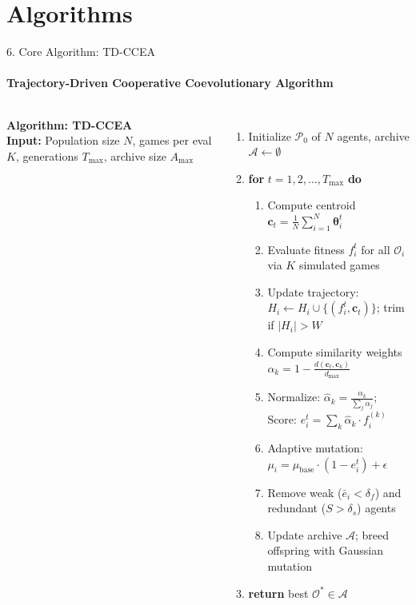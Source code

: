 \documentclass[aspectratio=169, 11pt]{beamer}
\begin{document}
\section{Algorithms}
\begin{frame}{6. Core Algorithm: TD-CCEA}
    \framesubtitle{Trajectory-Driven Cooperative Coevolutionary Algorithm}

    \begin{columns}[T]
        {\small
        \textbf{\textcolor{amritaMaroon}{Algorithm: TD-CCEA}} \\[0.2cm]
        \textbf{Input:} Population size $N$, games per eval $K$, generations $T_{\max}$, archive size $A_{\max}$ \\[0.1cm]
        \begin{enumerate}\footnotesize
            \item Initialize $\mathcal{P}_0$ of $N$ agents, archive $\mathcal{A} \leftarrow \emptyset$
            \item \textbf{for} $t = 1, 2, \ldots, T_{\max}$ \textbf{do}
            \begin{enumerate}\scriptsize
                \item[(a)] Compute centroid $\mathbf{c}_t = \frac{1}{N}\sum_{i=1}^{N}\boldsymbol{\theta}_i^t$
                \item[(b)] Evaluate fitness $f_i^t$ for all $\mathcal{O}_i$ via $K$ simulated games
                \item[(c)] Update trajectory: $H_i \leftarrow H_i \cup \{(f_i^t, \mathbf{c}_t)\}$; trim if $|H_i| > W$
                \item[(d)] Compute similarity weights $\alpha_k = 1 - \frac{d(\mathbf{c}_t, \mathbf{c}_k)}{d_{\max}}$
                \item[(e)] Normalize: $\hat{\alpha}_k = \frac{\alpha_k}{\sum_j \alpha_j}$; \quad Score: $e_i^t = \sum_k \hat{\alpha}_k \cdot f_i^{(k)}$
                \item[(f)] Adaptive mutation: $\mu_i = \mu_{\text{base}} \cdot (1 - e_i^t) + \epsilon$
                \item[(g)] Remove weak ($\bar{e}_i < \delta_f$) and redundant ($S > \delta_s$) agents
                \item[(h)] Update archive $\mathcal{A}$; breed offspring with Gaussian mutation
            \end{enumerate}
            \item \textbf{return} best $\mathcal{O}^* \in \mathcal{A}$
        \end{enumerate}
        }


\end{columns}
\end{frame}
\end{document}
